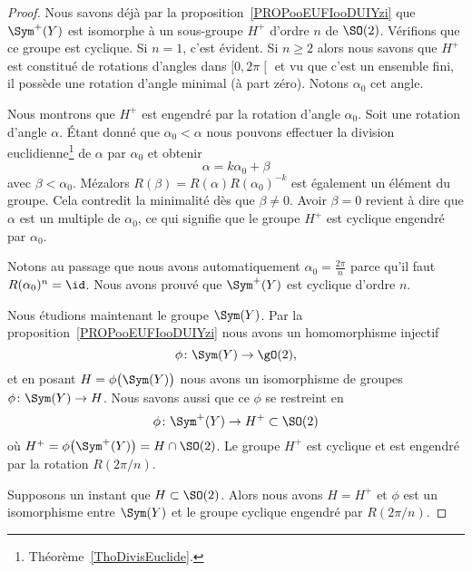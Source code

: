 \begin{proof}
    Nous savons déjà par la proposition~\ref{PROPooEUFIooDUIYzi} que \( \Sym^+(Y)\) est isomorphe à un sous-groupe \( H^+\) d'ordre \( n\) de \( \SO(2)\). Vérifions que ce groupe est cyclique. Si \( n=1\), c'est évident. Si \( n\geq 2\) alors nous savons que \( H^+\) est constitué de rotations d'angles dans \( \mathopen[ 0 , 2\pi \mathclose[\) et vu que c'est un ensemble fini, il possède une rotation d'angle minimal (à part zéro). Notons \( \alpha_0\) cet angle.

        Nous montrons que \( H^+\) est engendré par la rotation d'angle \( \alpha_0\). Soit une rotation d'angle \( \alpha\). Étant donné que \( \alpha_0<\alpha\) nous pouvons effectuer la division euclidienne\footnote{Théorème~\ref{ThoDivisEuclide}.} de \( \alpha\) par \( \alpha_0\) et obtenir
        \begin{equation}
            \alpha=k\alpha_0+\beta
        \end{equation}
        avec \( \beta<\alpha_0\). Mézalors \( R(\beta)=R(\alpha)R(\alpha_0)^{-k}\) est également un élément du groupe. Cela contredit la minimalité dès que \( \beta\neq 0\). Avoir \( \beta=0\) revient à dire que \( \alpha\) est un multiple de \( \alpha_0\), ce qui signifie que le groupe \( H^+\) est cyclique engendré par \( \alpha_0\).

        Notons au passage que nous avons automatiquement \( \alpha_0=\frac{ 2\pi }{ n }\) parce qu'il faut \( R(\alpha_0)^n=\id\). Nous avons prouvé que \( \Sym^+(Y) \) est cyclique d'ordre \( n\).

        Nous étudions maintenant le groupe \( \Sym(Y)\). Par la proposition~\ref{PROPooEUFIooDUIYzi} nous avons un homomorphisme injectif
        \begin{equation}
            \phi\colon \Sym(Y)\to \gO(2),
        \end{equation}
        et en posant \( H=\phi\big( \Sym(Y) \big)\) nous avons un isomorphisme de groupes \( \phi\colon \Sym(Y)\to H\). Nous savons aussi que ce \( \phi\) se restreint en
        \begin{equation}
            \phi\colon   \Sym^+(Y) \to H^+\subset\SO(2)
        \end{equation}
        où \( H^+=\phi\big( \Sym^+(Y) \big)=H\cap\SO(2)\). Le groupe \( H^+\) est cyclique et est engendré par la rotation \( R(2\pi/n)\).

        Supposons un instant que \( H\subset \SO(2)\). Alors nous avons \( H=H^+\) et \( \phi\) est un isomorphisme entre \( \Sym(Y)\) et le groupe cyclique engendré par \( R(2\pi/n)\).


\end{proof}
